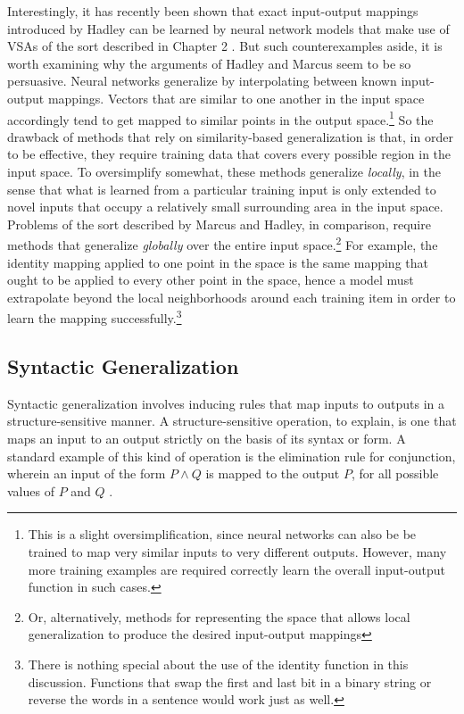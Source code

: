Interestingly, it has recently been shown that exact input-output mappings introduced by Hadley can be learned by neural network models that make use of VSAs of the sort described in Chapter 2 \citep[][pp. 269-72]{Eliasmith:2013}. But such counterexamples aside, it is worth examining why the arguments of Hadley and Marcus seem to be so persuasive. Neural networks generalize by interpolating between known input-output mappings. Vectors that are similar to one another in the input space accordingly tend to get mapped to similar points in the output space.\footnote{This is a slight oversimplification, since neural networks can also be be trained to map very similar inputs to very different outputs. However, many more training examples are required correctly learn the overall input-output function in such cases.} So the drawback of methods that rely on similarity-based generalization is that, in order to be effective, they require training data that covers every possible region in the input space. To oversimplify somewhat, these methods generalize \textit{locally}, in the sense that what is learned from a particular training input is only extended to novel inputs that occupy a relatively small surrounding area in the input space. Problems of the sort described by Marcus and Hadley, in comparison, require methods that generalize \textit{globally} over the entire input space.\footnote{Or, alternatively, methods for representing the space that allows local generalization to produce the desired input-output mappings} For example, the identity mapping applied to one point in the space is the same mapping that ought to be applied to every other point in the space, hence a model must extrapolate beyond the local neighborhoods around each training item in order to learn the mapping successfully.\footnote{There is nothing special about the use of the identity function in this discussion. Functions that swap the first and last bit in a binary string or reverse the words in a sentence would work just as well.}

\subsection{Syntactic Generalization}

Syntactic generalization involves inducing rules that map inputs to outputs in a structure-sensitive manner. A structure-sensitive operation, to explain, is one that maps an input to an output strictly on the basis of its syntax or form. A standard example of this kind of operation is the elimination rule for conjunction, wherein an input of the form $P \land Q$ is mapped to the output $P$, for all possible values of $P$ and $Q$ \citep{FodorPylyshyn:1988}. 

